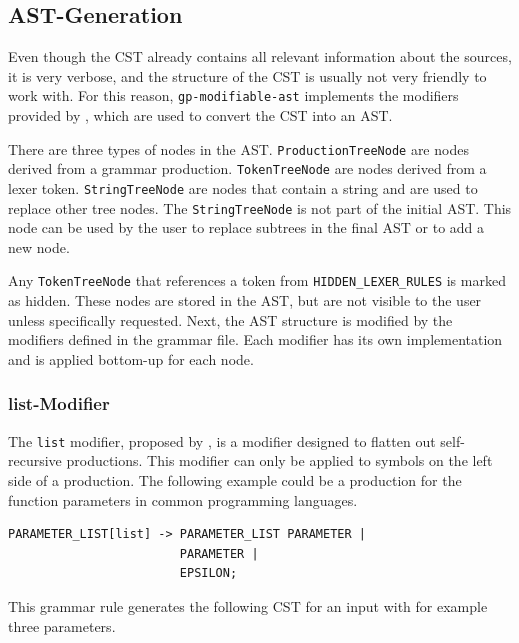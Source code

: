 \subsection{AST-Generation}
\label{chap:ast_generation}

Even though the CST already contains all relevant information about the sources, 
it is very verbose, and the structure of the CST is usually not very friendly to work with.
For this reason, \verb|gp-modifiable-ast| implements the modifiers provided by \cite{GeneratingRewritableAST}, 
which are used to convert the CST into an AST.

There are three types of nodes in the AST. \verb|ProductionTreeNode| are nodes derived from a grammar production. 
\verb|TokenTreeNode| are nodes derived from a lexer token. 
\verb|StringTreeNode| are nodes that contain a string and are used to replace other tree nodes. 
The \verb|StringTreeNode| is not part of the initial AST. 
This node can be used by the user to replace subtrees in the final AST or to add a new node.
 
Any \verb|TokenTreeNode| that references a token from \verb|HIDDEN_LEXER_RULES| is marked as hidden. 
These nodes are stored in the AST, but are not visible to the user unless specifically requested. 
Next, the AST structure is modified by the modifiers defined in the grammar file. 
Each modifier has its own implementation and is applied bottom-up for each node.

\subsubsection{list-Modifier}

The \verb|list| modifier, proposed by \cite{GeneratingRewritableAST}, is a modifier designed to flatten out self-recursive productions. 
This modifier can only be applied to symbols on the left side of a production. 
The following example could be a production for the function parameters in common programming languages.

\begin{lstlisting}[caption=list modifier example]
PARAMETER_LIST[list] -> PARAMETER_LIST PARAMETER | 
                        PARAMETER | 
                        EPSILON;
\end{lstlisting}

This grammar rule generates the following CST for an input with for example three parameters.


